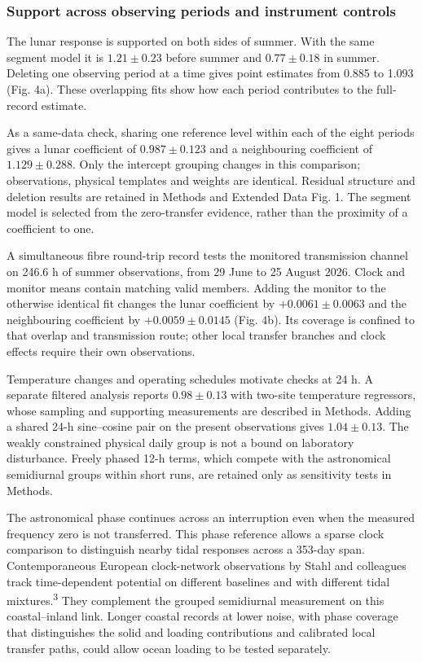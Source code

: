\documentclass[
  10pt,
  a4paper,
]{article}
\begin{document}
\hypertarget{support-across-observing-periods-and-instrument-controls}{%
\subsubsection{Support across observing periods and instrument
controls}\label{support-across-observing-periods-and-instrument-controls}}

The lunar response is supported on both sides of summer. With the same
segment model it is \(1.21\pm0.23\) before summer and \(0.77\pm0.18\) in
summer. Deleting one observing period at a time gives point estimates
from 0.885 to 1.093 (Fig. 4a). These overlapping fits show how each
period contributes to the full-record estimate.

As a same-data check, sharing one reference level within each of the
eight periods gives a lunar coefficient of \(0.987\pm0.123\) and a
neighbouring coefficient of \(1.129\pm0.288\). Only the intercept
grouping changes in this comparison; observations, physical templates
and weights are identical. Residual structure and deletion results are
retained in Methods and Extended Data Fig. 1. The segment model is
selected from the zero-transfer evidence, rather than the proximity of a
coefficient to one.

A simultaneous fibre round-trip record tests the monitored transmission
channel on 246.6 h of summer observations, from 29 June to 25 August
2026. Clock and monitor means contain matching valid members. Adding the
monitor to the otherwise identical fit changes the lunar coefficient by
\(+0.0061\pm0.0063\) and the neighbouring coefficient by
\(+0.0059\pm0.0145\) (Fig. 4b). Its coverage is confined to that overlap
and transmission route; other local transfer branches and clock effects
require their own observations.

Temperature changes and operating schedules motivate checks at 24 h. A
separate filtered analysis reports \(0.98\pm0.13\) with two-site
temperature regressors, whose sampling and supporting measurements are
described in Methods. Adding a shared 24-h sine--cosine pair on the
present observations gives \(1.04\pm0.13\). The weakly constrained
physical daily group is not a bound on laboratory disturbance. Freely
phased 12-h terms, which compete with the astronomical semidiurnal
groups within short runs, are retained only as sensitivity tests in
Methods.

The astronomical phase continues across an interruption even when the
measured frequency zero is not transferred. This phase reference allows
a sparse clock comparison to distinguish nearby tidal responses across a
353-day span. Contemporaneous European clock-network observations by
Stahl and colleagues track time-dependent potential on different
baselines and with different tidal mixtures.\textsuperscript{3} They
complement the grouped semidiurnal measurement on this coastal--inland
link. Longer coastal records at lower noise, with phase coverage that
distinguishes the solid and loading contributions and calibrated local
transfer paths, could allow ocean loading to be tested separately.
\end{document}
